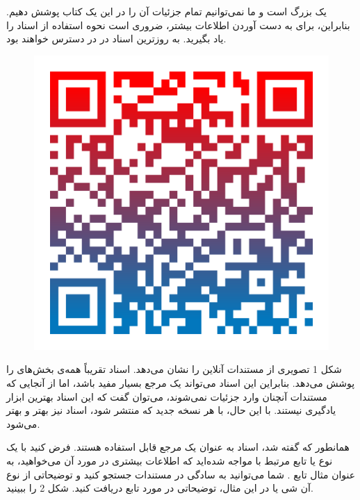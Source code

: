 {
    \Large
     یک  بزرگ است و ما نمی‌توانیم تمام جزئیات آن را در این یک کتاب پوشش دهیم.
    بنابراین، برای به دست آوردن اطلاعات بیشتر، ضروری است نحوه استفاده از اسناد  را یاد بگیرید.
    به روزترین اسناد در  در دسترس خواهند بود.

    \begin{figure}[H]
        \centering
        \setlength{\belowcaptionskip}{-10pt}
        \includegraphics[scale=0.15]{Images/1.Intro.0.2.png}
                \caption*{\Large {}}
    \end{figure}

    شکل 1 تصویری از مستندات آنلاین را نشان می‌دهد.
    اسناد  تقریباً همه‌ی بخش‌های  را پوشش می‌دهد.
    بنابراین این اسناد می‌تواند یک مرجع بسیار مفید باشد، اما از آنجایی که مستندات آنچنان وارد جزئیات نمی‌شوند، می‌توان گفت که این اسناد بهترین ابزار یادگیری نیستند. با این حال، با هر نسخه جدید  که منتشر شود، اسناد نیز بهتر و بهتر می‌شود.

    همانطور که گفته شد، اسناد به عنوان یک مرجع قابل استفاده هستند.
    فرض کنید با یک نوع یا تابع مرتبط با  مواجه شده‌اید که اطلاعات بیشتری در مورد آن می‌خواهید، به عنوان مثال تابع .
    شما می‌توانید به سادگی در مستندات جستجو کنید و توضیحاتی از نوع آن شی یا در این مثال، توضیحاتی در مورد تابع دریافت کنید. شکل 2 را ببینید.

}
